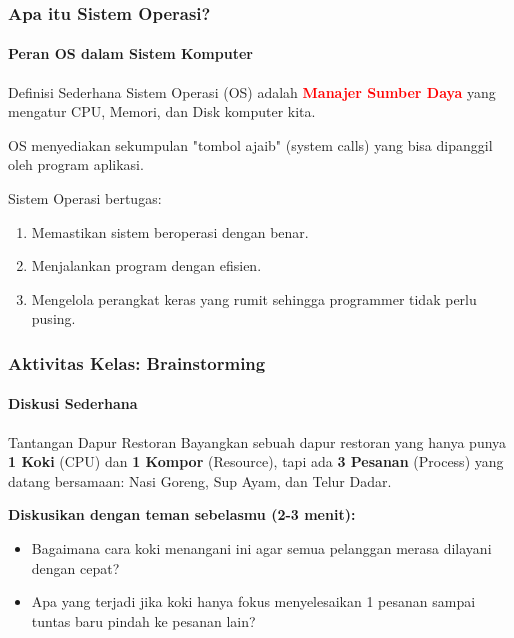 \documentclass[t,aspectratio=169,xcolor=dvipsnames]{beamer}
\newcommand{\tem}[1]{\textbf{\textcolor{red}{#1}}}
\begin{document}
\begin{frame}[t]
    \frametitle{Apa itu Sistem Operasi?}
    \framesubtitle{Peran OS dalam Sistem Komputer}
    
    \begin{block}{Definisi Sederhana}
        Sistem Operasi (OS) adalah \tem{Manajer Sumber Daya} yang mengatur CPU, Memori, dan Disk komputer kita.
    \end{block}
    \vspace{0.3cm}
    
    \small
    OS menyediakan sekumpulan "tombol ajaib" (system calls) yang bisa dipanggil oleh program aplikasi.
    
    Sistem Operasi bertugas:
    \begin{enumerate}
        \item Memastikan sistem beroperasi dengan benar.
        \item Menjalankan program dengan efisien.
        \item Mengelola perangkat keras yang rumit sehingga programmer tidak perlu pusing.
    \end{enumerate}
\end{frame}

\begin{frame}[t]
    \frametitle{Aktivitas Kelas: Brainstorming}
    \framesubtitle{Diskusi Sederhana}

    \begin{alertblock}{Tantangan Dapur Restoran}
        Bayangkan sebuah dapur restoran yang hanya punya \textbf{1 Koki} (CPU) dan \textbf{1 Kompor} (Resource), tapi ada \textbf{3 Pesanan} (Process) yang datang bersamaan: Nasi Goreng, Sup Ayam, dan Telur Dadar.
    \end{alertblock}
    \vspace{0.3cm}

    \textbf{Diskusikan dengan teman sebelasmu (2-3 menit):}
    \begin{itemize}
        \item Bagaimana cara koki menangani ini agar semua pelanggan merasa dilayani dengan cepat?
        \item Apa yang terjadi jika koki hanya fokus menyelesaikan 1 pesanan sampai tuntas baru pindah ke pesanan lain?
    \end{itemize}
\end{frame}
\end{document}
